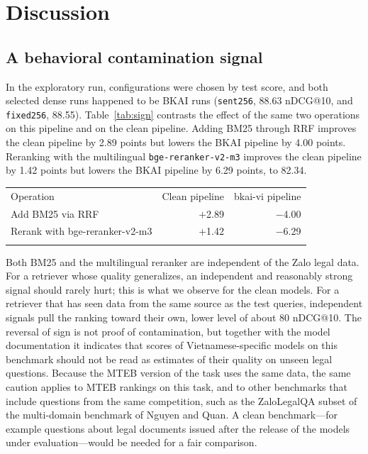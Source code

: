 \documentclass{ws-vjcs}
\begin{document}
\section{Discussion}

\subsection{A behavioral contamination signal}
\label{sec:contam}

In the exploratory run, configurations were chosen by test score, and both selected dense runs happened to be BKAI runs (\texttt{sent256}, 88.63 nDCG@10, and \texttt{fixed256}, 88.55). Table~\ref{tab:sign} contrasts the effect of the same two operations on this pipeline and on the clean pipeline. Adding BM25 through RRF improves the clean pipeline by 2.89 points but lowers the BKAI pipeline by 4.00 points. Reranking with the multilingual \texttt{bge-reranker-v2-m3} improves the clean pipeline by 1.42 points but lowers the BKAI pipeline by 6.29 points, to 82.34.

\begin{table}[t]
{\begin{tabular}{@{}lrr@{}} \toprule
Operation & Clean pipeline & bkai-vi pipeline \\ \colrule
Add BM25 via RRF & $+$2.89 & $-$4.00 \\
Rerank with bge-reranker-v2-m3 & $+$1.42 & $-$6.29 \\ \botrule
\end{tabular}}
\end{table}

Both BM25 and the multilingual reranker are independent of the Zalo legal data. For a retriever whose quality generalizes, an independent and reasonably strong signal should rarely hurt; this is what we observe for the clean models. For a retriever that has seen data from the same source as the test queries, independent signals pull the ranking toward their own, lower level of about 80 nDCG@10. The reversal of sign is not proof of contamination, but together with the model documentation it indicates that scores of Vietnamese-specific models on this benchmark should not be read as estimates of their quality on unseen legal questions. Because the MTEB version of the task uses the same data, the same caution applies to MTEB rankings on this task, and to other benchmarks that include questions from the same competition, such as the ZaloLegalQA subset of the multi-domain benchmark of Nguyen and Quan.\cite{nguyen2026vire} A clean benchmark---for example questions about legal documents issued after the release of the models under evaluation---would be needed for a fair comparison.
\end{document}
